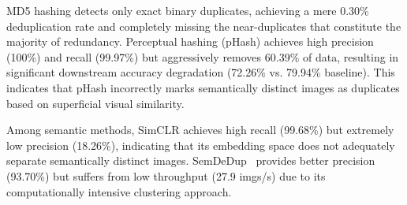 \documentclass[conference]{IEEEtran}
\renewcommand{\arraystretch}{1.15}
\begin{document}
\begin{table}[t]
\caption{Image deduplication performance comparison.}
\label{tab:image_dedup}
\centering
\scriptsize
\setlength{\tabcolsep}{3pt}
\renewcommand{\arraystretch}{1.10}
\end{table}

MD5 hashing detects only exact binary duplicates, achieving a mere 0.30\% deduplication rate and completely missing the near-duplicates that constitute the majority of redundancy. Perceptual hashing (pHash) achieves high precision (100\%) and recall (99.97\%) but aggressively removes 60.39\% of data, resulting in significant downstream accuracy degradation (72.26\% vs. 79.94\% baseline). This indicates that pHash incorrectly marks semantically distinct images as duplicates based on superficial visual similarity.

Among semantic methods, SimCLR achieves high recall (99.68\%) but extremely low precision (18.26\%), indicating that its embedding space does not adequately separate semantically distinct images. SemDeDup~\cite{abbas2023semdedup} provides better precision (93.70\%) but suffers from low throughput (27.9 imgs/s) due to its computationally intensive clustering approach.
\end{document}
